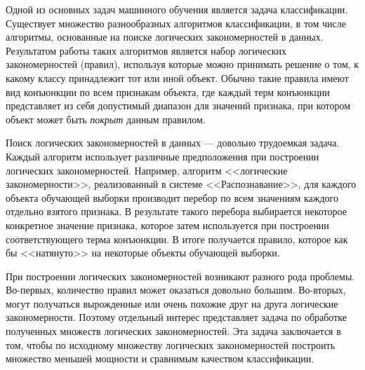 \documentclass[12pt]{article}
\begin{document}




Одной из основных задач машинного обучения является задача
классификации. Существует множество разнообразных алгоритмов
классификации, в том числе алгоритмы, основанные на поиске логических
закономерностей в данных. Результатом работы таких алгоритмов является
набор логических закономерностей (правил), используя которые можно
принимать решение о том, к какому классу принадлежит тот или иной
объект. Обычно такие правила имеют вид конъюнкции по всем признакам
объекта, где каждый терм конъюнкции представляет из себя допустимый
диапазон для значений признака, при котором объект может быть
\emph{покрыт} данным правилом.

Поиск логических закономерностей в данных --- довольно трудоемкая
задача. Каждый алгоритм использует различные предположения при
построении логических закономерностей. Например, алгоритм <<логические
закономерности>>, реализованный в системе
<<Распознавание>>\cite{recognition06}, для каждого объекта обучающей
выборки производит перебор по всем значениям каждого отдельно взятого
признака. В результате такого перебора выбирается некоторое конкретное
значение признака, которое затем используется при построении
соответствующего терма конъюнкции. В итоге получается правило, которое
как бы <<натянуто>> на некоторые объекты обучающей выборки.

При построении логических закономерностей возникают разного рода
проблемы. Во-первых, количество правил может оказаться довольно
большим. Во-вторых, могут получаться вырожденные или очень похожие
друг на друга логические закономерности. Поэтому отдельный интерес
представляет задача по обработке полученных множеств логических
закономерностей. Эта задача заключается в том, чтобы по исходному
множеству логических закономерностей построить множество меньшей
мощности и сравнимым качеством классификации.
\end{document}
